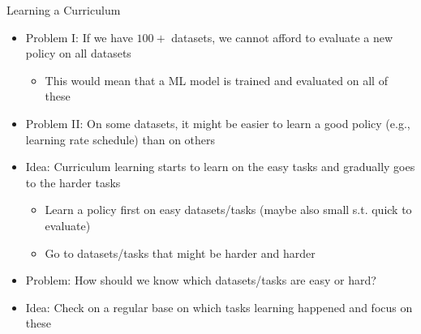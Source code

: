 \begin{frame}[c]{Learning a Curriculum}

	\begin{itemize}
	    \item \alert{Problem I:} If we have $100+$ datasets, we cannot afford to evaluate a new policy on all datasets
	    \begin{itemize}
	        \item This would mean that a ML model is trained and evaluated on all of these 
	    \end{itemize}
	    \pause
	    \smallskip
	    \item \alert{Problem II:} On some datasets, it might be easier to learn a good policy (e.g., learning rate schedule) than on others
	    \pause
	    \smallskip
	    \item Idea: Curriculum learning starts to learn on the easy tasks and gradually goes to the harder tasks
	    \begin{itemize}
	        \item Learn a policy first on easy datasets/tasks (maybe also small s.t. quick to evaluate)
	        \item Go to datasets/tasks that might be harder and harder
	    \end{itemize}
	    \pause
	    \smallskip
	    \item \alert{Problem:} How should we know which datasets/tasks are easy or hard?
	    \pause
	    \item \alert{Idea:} Check on a regular base on which tasks learning happened and focus on these 
	\end{itemize}	
	
\end{frame}
